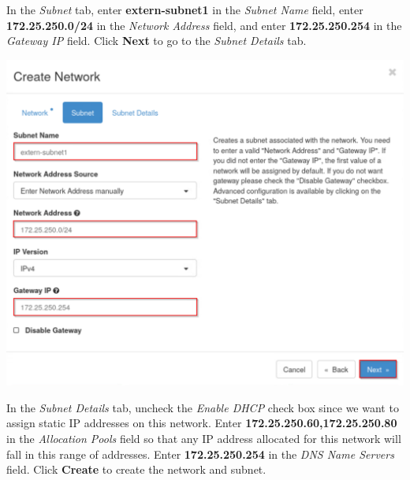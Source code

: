 \documentclass[letterpaper, 12pt]{article}
\begin{document}
\begin{enumerate}
    \begin{labstep}
        In the \textit{Subnet} tab, enter \textbf{extern-subnet1} in the \textit{Subnet Name} field, enter \textbf{172.25.250.0/24} in the \textit{Network Address} field, and enter \textbf{172.25.250.254} in the \textit{Gateway IP} field.
        Click \textbf{Next} to go to the \textit{Subnet Details} tab.

        \begin{center}
            \includegraphics[width=\linewidth]{images/part1/step8.png}
        \end{center}
    \end{labstep}

    \begin{labstep}
        In the \textit{Subnet Details} tab, uncheck the \textit{Enable DHCP} check box since we want to assign static IP addresses on this network.
        Enter \textbf{172.25.250.60,172.25.250.80} in the \textit{Allocation Pools} field so that any IP address allocated for this network will fall in this range of addresses.
        Enter \textbf{172.25.250.254} in the \textit{DNS Name Servers} field.
        Click \textbf{Create} to create the network and subnet.


\end{labstep}
\end{enumerate}
\end{document}
